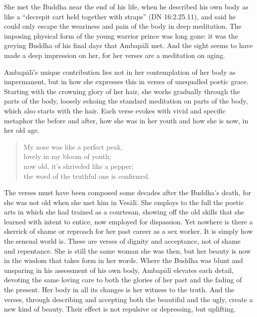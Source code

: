 \documentclass[12pt,openany]{book}%
\begin{document}
She met the Buddha near the end of his life, when he described his own body as like a “decrepit cart held together with straps” (DN 16:2.25.11), and said he could only escape the weariness and pain of the body in deep meditation. The imposing physical form of the young warrior prince was long gone: it was the greying Buddha of his final days that \textsanskrit{Ambapālī} met. And the sight seems to have made a deep impression on her, for her verses are a meditation on aging.

\textsanskrit{Ambapālī}’s unique contribution lies not in her contemplation of her body as impermanent, but in how she expresses this in verses of unequalled poetic grace. Starting with the crowning glory of her hair, she works gradually through the parts of the body, loosely echoing the standard meditation on parts of the body, which also starts with the hair. Each verse evokes with vivid and specific metaphor the before and after, how she was in her youth and how she is now, in her old age. 

\begin{quotation}%
My nose was like a perfect peak, \\
lovely in my bloom of youth; \\
now old, it’s shriveled like a pepper; \\
the word of the truthful one is confirmed.

%
\end{quotation}

The verses must have been composed some decades after the Buddha’s death, for she was not old when she met him in \textsanskrit{Vesālī}. She employs to the full the poetic arts in which she had trained as a courtesan, showing off the old skills that she learned with intent to entice, now employed for dispassion. Yet nowhere is there a skerrick of shame or reproach for her past career as a sex worker. It is simply how the sensual world is. These are verses of dignity and acceptance, not of shame and repentance. She is still the same woman she was then, but her beauty is now in the wisdom that takes form in her words. Where the Buddha was blunt and unsparing in his assessment of his own body, \textsanskrit{Ambapālī} elevates each detail, devoting the same loving care to both the glories of her past and the fading of the present. Her body in all its changes is her witness to the truth. And the verses, through describing and accepting both the beautiful and the ugly, create a new kind of beauty. Their effect is not repulsive or depressing, but uplifting.
\end{document}
